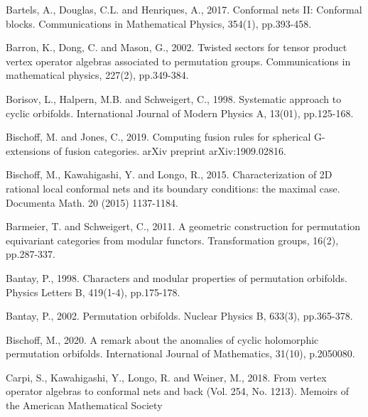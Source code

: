 \documentclass[12pt,a4paper,notitlepage]{article}
\theoremstyle{definition}
\theoremstyle{plain}
\numberwithin{equation}{subsection}
\begin{document}
\printindex	
	\begin{thebibliography}{999999}
		\footnotesize	
		
		
		
		


Bartels, A., Douglas, C.L. and Henriques, A., 2017. Conformal nets II: Conformal blocks. Communications in Mathematical Physics, 354(1), pp.393-458.


Barron, K., Dong, C. and Mason, G., 2002. Twisted sectors for tensor product vertex operator algebras associated to permutation groups. Communications in mathematical physics, 227(2), pp.349-384.

Borisov, L., Halpern, M.B. and Schweigert, C., 1998. Systematic approach to cyclic orbifolds. International Journal of Modern Physics A, 13(01), pp.125-168.


Bischoff, M. and Jones, C., 2019. Computing fusion rules for spherical G-extensions of fusion categories. arXiv preprint arXiv:1909.02816.


Bischoff, M., Kawahigashi, Y. and Longo, R., 2015. Characterization of 2D rational local conformal nets and its boundary conditions: the maximal case. Documenta Math. 20 (2015) 1137-1184.


Barmeier, T. and Schweigert, C., 2011. A geometric construction for permutation equivariant categories from modular functors. Transformation groups, 16(2), pp.287-337.


Bantay, P., 1998. Characters and modular properties of permutation orbifolds. Physics Letters B, 419(1-4), pp.175-178.

Bantay, P., 2002. Permutation orbifolds. Nuclear Physics B, 633(3), pp.365-378.

Bischoff, M., 2020. A remark about the anomalies of cyclic holomorphic permutation orbifolds. International Journal of Mathematics, 31(10), p.2050080.

Carpi, S., Kawahigashi, Y., Longo, R. and Weiner, M., 2018. From vertex operator algebras to conformal nets and back (Vol. 254, No. 1213). Memoirs of the American Mathematical Society



\end{thebibliography}
\end{document}

